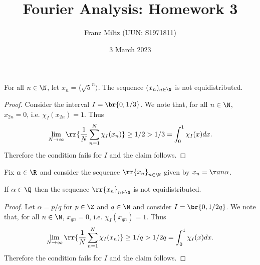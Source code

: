 \documentclass{article}
\begin{document}
\title{Fourier Analysis: Homework 3}
\author{Franz Miltz (UUN: S1971811)}
\date{3 March 2023}
\maketitle

\begin{claim*}[1]
  For all $n\in\N$, let $x_n = \langle\sqrt{5}^n\rangle$. The sequence
  $(x_n)_{n\in\N}$ is not equidistributed.
  \begin{proof}
    Consider the interval $I=\br{0,1/3}$. We note that, for all $n\in\N$,
    $x_{2n}=0$, i.e. $\chi_I(x_{2n}) = 1$. Thus
    \begin{align*}
      \lim_{N\to\infty} \rr{\frac{1}{N}\sum_{n=1}^N \chi_I(x_n)}
      \geq 1/2 > 1/3 = \int_0^1 \chi_I(x) dx.
    \end{align*}
    Therefore the condition fails for $I$ and the claim follows.
  \end{proof}
\end{claim*}

Fix $\alpha\in\R$ and consider the sequence $\rr{x_n}_{n\in\N}$ given by
$x_n = \aa{n\alpha}$.

\begin{claim*}[4a]
  If $\alpha\in\Q$ then the sequence $\rr{x_n}_{n\in\N}$ is not equidistributed.
  \begin{proof}
    Let $\alpha = p/q$ for $p\in\Z$ and $q\in\N$ and consider $I=\br{0,1/2q}$.
    We note that, for all $n\in\N$, $x_{qn}=0$, i.e. $\chi_I(x_{qn})=1$. Thus
    \begin{align*}
      \lim_{N\to\infty} \rr{\frac{1}{N}\sum_{n=1}^N \chi_I(x_n)} \geq 1/q > 1/2q
      =\int_0^1 \chi_I(x)dx.
    \end{align*}
    Therefore the condition fails for $I$ and the claim follows.
  \end{proof}
\end{claim*}
\end{document}
